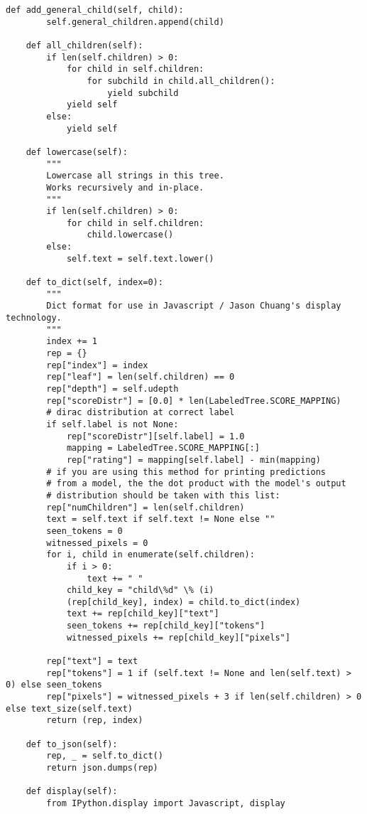 \begin{lstlisting}[style=app]
    def add_general_child(self, child):
        self.general_children.append(child)

    def all_children(self):
        if len(self.children) > 0:
            for child in self.children:
                for subchild in child.all_children():
                    yield subchild
            yield self
        else:
            yield self

    def lowercase(self):
        """
        Lowercase all strings in this tree.
        Works recursively and in-place.
        """
        if len(self.children) > 0:
            for child in self.children:
                child.lowercase()
        else:
            self.text = self.text.lower()

    def to_dict(self, index=0):
        """
        Dict format for use in Javascript / Jason Chuang's display technology.
        """
        index += 1
        rep = {}
        rep["index"] = index
        rep["leaf"] = len(self.children) == 0
        rep["depth"] = self.udepth
        rep["scoreDistr"] = [0.0] * len(LabeledTree.SCORE_MAPPING)
        # dirac distribution at correct label
        if self.label is not None:
            rep["scoreDistr"][self.label] = 1.0
            mapping = LabeledTree.SCORE_MAPPING[:]
            rep["rating"] = mapping[self.label] - min(mapping)
        # if you are using this method for printing predictions
        # from a model, the the dot product with the model's output
        # distribution should be taken with this list:
        rep["numChildren"] = len(self.children)
        text = self.text if self.text != None else ""
        seen_tokens = 0
        witnessed_pixels = 0
        for i, child in enumerate(self.children):
            if i > 0:
                text += " "
            child_key = "child\%d" \% (i)
            (rep[child_key], index) = child.to_dict(index)
            text += rep[child_key]["text"]
            seen_tokens += rep[child_key]["tokens"]
            witnessed_pixels += rep[child_key]["pixels"]

        rep["text"] = text
        rep["tokens"] = 1 if (self.text != None and len(self.text) > 0) else seen_tokens
        rep["pixels"] = witnessed_pixels + 3 if len(self.children) > 0 else text_size(self.text)
        return (rep, index)

    def to_json(self):
        rep, _ = self.to_dict()
        return json.dumps(rep)

    def display(self):
        from IPython.display import Javascript, display


\end{lstlisting}
